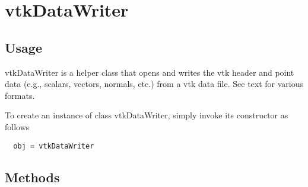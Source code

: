 \section{vtkDataWriter}

\subsection{Usage}

 vtkDataWriter is a helper class that opens and writes the vtk header and 
 point data (e.g., scalars, vectors, normals, etc.) from a vtk data file. 
 See text for various formats.

To create an instance of class vtkDataWriter, simply
invoke its constructor as follows
\begin{verbatim}
  obj = vtkDataWriter
\end{verbatim}
\subsection{Methods}

